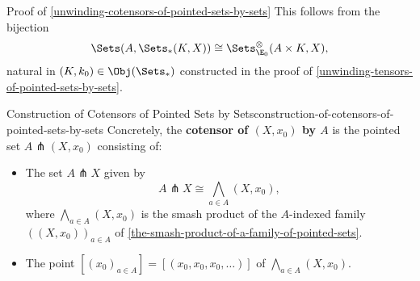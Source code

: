 \begin{Proof}{Proof of \cref{unwinding-cotensors-of-pointed-sets-by-sets}}%
    This follows from the bijection
    \[
        \Sets(A,\Sets_{*}(K,X))%
        \cong%
        \Sets^{\otimes}_{\E_{0}}(A\times K,X),%
    \]%
    natural in $(K,k_{0})\in\Obj(\Sets_{*})$ constructed in the proof of \cref{unwinding-tensors-of-pointed-sets-by-sets}.
\end{Proof}
\begin{construction}{Construction of Cotensors of Pointed Sets by Sets}{construction-of-cotensors-of-pointed-sets-by-sets}%
    Concretely, the \textbf{cotensor of $(X,x_{0})$ by $A$} is the pointed set $A\pitchfork(X,x_{0})$ consisting of:
    \begin{itemize}
        \item{}The set $A\pitchfork X$ given by
            \[
                A\pitchfork X%
                \cong%
                \bigwedge_{a\in A}(X,x_{0}),%
            \]%
            where $\bigwedge_{a\in A}(X,x_{0})$ is the smash product of the $A$-indexed family $((X,x_{0}))_{a\in A}$ of \cref{the-smash-product-of-a-family-of-pointed-sets}.
        \item{}The point $[(x_{0})_{a\in A}]=[(x_{0},x_{0},x_{0},\ldots)]$ of $\bigwedge_{a\in A}(X,x_{0})$.
    \end{itemize}
\end{construction}
